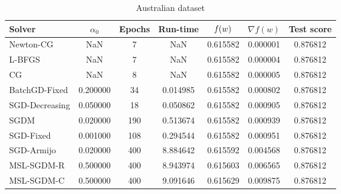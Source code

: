 \begin{table}
\caption{Australian dataset}
\label{tab:austr-tab}
\centering
\begin{tabular}{lS[round-precision=3]S[drop-zero-decimal]S[round-precision=4]S[round-precision=6]S[exponent-mode=scientific]S[round-precision=6]}
\toprule
Solver & {$\alpha_0$} & {Epochs} & {Run-time} & {$\operatorname*{\mathit{f}}(w)$} & {$\nabla f(w)$} & {Test score} \\
\midrule
Newton-CG & NaN & 7 & NaN & 0.615582 & 0.000001 & 0.876812 \\
L-BFGS & NaN & 7 & NaN & 0.615582 & 0.000004 & 0.876812 \\
CG & NaN & 8 & NaN & 0.615582 & 0.000005 & 0.876812 \\
BatchGD-Fixed & 0.200000 & 34 & 0.014985 & 0.615582 & 0.000802 & 0.876812 \\
SGD-Decreasing & 0.050000 & 18 & 0.050862 & 0.615582 & 0.000905 & 0.876812 \\
SGDM & 0.020000 & 190 & 0.513674 & 0.615582 & 0.000939 & 0.876812 \\
SGD-Fixed & 0.001000 & 108 & 0.294544 & 0.615582 & 0.000951 & 0.876812 \\
SGD-Armijo & 0.020000 & 400 & 8.884642 & 0.615592 & 0.004568 & 0.876812 \\
MSL-SGDM-R & 0.500000 & 400 & 8.943974 & 0.615603 & 0.006565 & 0.876812 \\
MSL-SGDM-C & 0.500000 & 400 & 9.091646 & 0.615629 & 0.009875 & 0.876812 \\
\bottomrule
\end{tabular}
\end{table}


